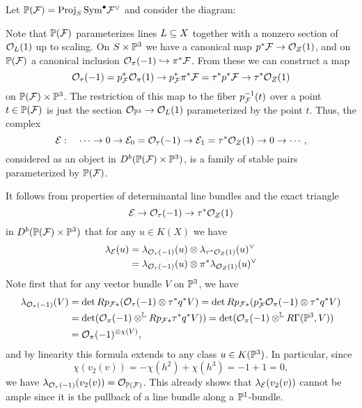 \begin{expl}
Let $\mathbb{P}(\mathcal{F}) = \operatorname{\mathrm{Proj}}_S \mathrm{Sym}^\bullet \mathcal{F}^\vee$ and consider the diagram:
\begin{center}
\end{center}
Note that $\mathbb{P}(\mathcal{F})$ parameterizes lines $L \subseteq X$ together with a nonzero section of $\mathcal{O}_L(1)$ up to scaling. On $S \times \mathbb{P}^3$ we have a canonical map $p^* \mathcal{F} \to \mathcal{O}_Z(1)$, and on $\mathbb{P}(\mathcal{F})$ a canonical inclusion $\mathcal{O}_\pi(-1) \hookrightarrow \pi^*\mathcal{F}$. From these we can construct a map 
\[ \mathcal{O}_\tau(-1) = p_{\mathcal{F}}^*\mathcal{O}_\pi(1) \to p_{\mathcal{F}}^* \pi^* \mathcal{F} = \tau^* p^* \mathcal{F} \to \tau^*\mathcal{O}_Z(1) \]
on $\mathbb{P}(\mathcal{F}) \times \mathbb{P}^3$. The restriction of this map to the fiber $p_{\mathcal{F}}^{-1}(t)$ over a point $t \in \mathbb{P}(\mathcal{F})$ is just the section $\mathcal{O}_{\mathbb{P}^3} \to \mathcal{O}_L(1)$ parameterized by the point $t$. Thus, the complex
\[ \mathcal{E}: \quad \cdots \to 0 \to \mathcal{E}_0 = \mathcal{O}_\tau(-1) \to \mathcal{E}_1 = \tau^*\mathcal{O}_Z(1) \to 0 \to \cdots,  \]
considered as an object in $D^b(\mathbb{P}(\mathcal{F}) \times \mathbb{P}^3)$, is a family of stable pairs parameterized by $\mathbb{P}(\mathcal{F})$.

It follows from properties of determinantal line bundles and the exact triangle
\[ \mathcal{E} \to \mathcal{O}_\tau(-1) \to \tau^*\mathcal{O}_Z(1) \]
in $D^b(\mathbb{P}(\mathcal{F}) \times \mathbb{P}^3)$ that for any $u \in K(X)$ we have
\begin{align*}
    \lambda_{\mathcal{E}}(u) & = \lambda_{\mathcal{O}_\tau(-1)}(u) \otimes \lambda_{\tau^*\mathcal{O}_Z(1)}(u)^\vee \\
    & = \lambda_{\mathcal{O}_\tau(-1)}(u) \otimes \pi^* \lambda_{\mathcal{O}_Z(1)}(u)^\vee
\end{align*}
Note first that for any vector bundle $V$ on $\mathbb{P}^3$, we have
\begin{align*}
    \lambda_{\mathcal{O}_\tau(-1)}(V) & = \det R p_{\mathcal{F} *}(\mathcal{O}_\tau(-1) \otimes \tau^* q^*V) = \det R p_{\mathcal{F} *}(p_{\mathcal{F}}^* \mathcal{O}_\pi(-1) \otimes \tau^* q^*V) \\
    & = \det (\mathcal{O}_\pi(-1) \otimes^{\mathbb{L}} R p_{\mathcal{F} *} \tau^* q^*V)) = \det(\mathcal{O}_\pi(-1) \otimes^{\mathbb{L}} R\Gamma(\mathbb{P}^3, V)) \\
    & = \mathcal{O}_\pi(-1)^{\otimes \chi(V)},
\end{align*}
and by linearity this formula extends to any class $u \in K(\mathbb{P}^3)$. In particular, since 
\[ \chi(v_2(v)) = -\chi(h^2) + \chi(h^3) = -1 + 1 = 0, \]
we have $\lambda_{\mathcal{O}_\tau(-1)}(v_2(v)) = \mathcal{O}_{\mathbb{P}(\mathcal{F})}$. This already shows that $\lambda_{\mathcal{E}}(v_2(v))$ cannot be ample since it is the pullback of a line bundle along a $\mathbb{P}^1$-bundle.


\end{expl}
